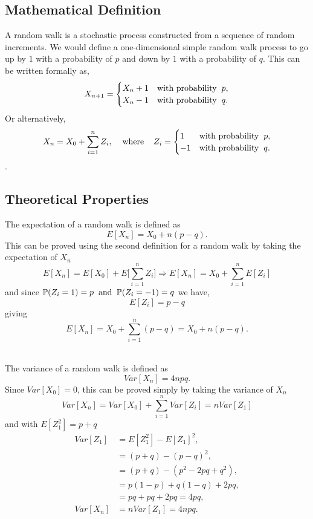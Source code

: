 \documentclass[11pt,a4paper]{article}
\begin{document}
\subsection{Mathematical Definition}
A random walk is a stochastic process constructed from a sequence of random increments. We would define a one-dimensional simple random walk process to go up by $1$ with a probability of $p$ and down by $1$ with a probability of $q$. This can be written formally as, \[ X_{n+1} = \begin{cases} X_n+1 &\text{with probability} \hspace{2mm}p,\\X_n-1 &\text{with probability} \hspace{2mm}q.\end{cases}
\]
Or alternatively, \[ X_n = X_0 + \sum^n_{i=1}Z_i, \hspace{4mm} \text{where} \hspace{4mm} Z_i = \begin{cases}
    1  &\text{with probability} \hspace{2mm}p,\\
    -1  &\text{with probability}\hspace{2mm} q.
\end{cases}\].

\subsection{Theoretical Properties}
The expectation of a random walk is defined as \[E[X_n] = X_0+n(p-q).\]
This can be proved using the second definition for a random walk by taking the expectation of $X_n$ \[E[X_n] = E[X_0] +E\Bigg[\sum^n_{i=1}Z_i\Bigg] \Rightarrow E[X_n] = X_0 + \sum^n_{i=1}E[Z_i]\]
and since $\mathbb{P}(Z_i = 1)=p \hspace{2mm} \text{and} \hspace{2mm} \mathbb{P}(Z_i=-1) = q$ we have, \[E[Z_i] = p- q\]
giving \[E[X_n] = X_0 + \sum^n_{i=1}(p - q) = X_0 + n(p-q).\]




\noindent\\The variance of a random walk is defined as \[Var[X_n] = 4npq.\]
Since $Var[X_0]=0$, this can be proved simply by taking the variance of $X_n$ \[Var[X_n] = Var[X_0] + \sum^n_{i=1}Var[Z_i] = nVar[Z_1]\]
and with $E[Z_1^2]= p+q$
\begin{align*}
Var[Z_1] &= E[Z_1^2]-E[Z_1]^2,\\
&= (p+q)-(p-q)^2,\\
&= (p+q) - (p^2-2pq+q^2),\\
&= p(1-p) + q(1-q) + 2pq,\\
&= pq + pq + 2pq=4pq,\\
Var[X_n] &= nVar[Z_1] = 4npq.
\end{align*}
\end{document}
